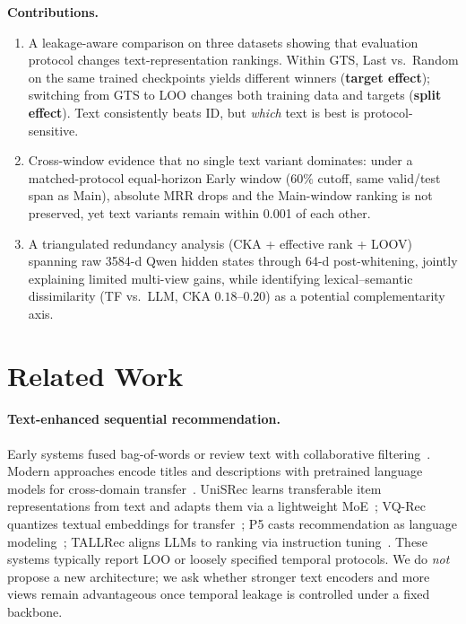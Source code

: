 \documentclass[sigconf,natbib=true,anonymous]{acmart}
\begin{document}
\smallskip\noindent\textbf{Contributions.}
\begin{enumerate}[leftmargin=*,itemsep=1pt]
\item A leakage-aware comparison on three datasets showing that evaluation protocol changes text-representation rankings.  Within GTS, Last vs.\ Random on the same trained checkpoints yields different winners (\textbf{target effect}); switching from GTS to LOO changes both training data and targets (\textbf{split effect}).  Text consistently beats ID, but \emph{which} text is best is protocol-sensitive.
\item Cross-window evidence that no single text variant dominates: under a matched-protocol equal-horizon Early window ($60\%$ cutoff, same valid/test span as Main), absolute MRR drops and the Main-window ranking is not preserved, yet text variants remain within 0.001 of each other.
\item A triangulated redundancy analysis (CKA + effective rank + LOOV) spanning raw 3584-d Qwen hidden states through 64-d post-whitening, jointly explaining limited multi-view gains, while identifying lexical--semantic dissimilarity (TF vs.\ LLM, CKA $0.18$--$0.20$) as a potential complementarity axis.
\end{enumerate}

\section{Related Work}
\label{sec:related}

\paragraph{Text-enhanced sequential recommendation.}
Early systems fused bag-of-words or review text with collaborative filtering~\cite{wang2015cdl,salton1988termweighting}.
Modern approaches encode titles and descriptions with pretrained language models for cross-domain transfer~\cite{hou2022unisrec,hou2023vqrec,geng2022p5,bao2023tallrec}.
UniSRec learns transferable item representations from text and adapts them via a lightweight MoE~\cite{hou2022unisrec}; VQ-Rec quantizes textual embeddings for transfer~\cite{hou2023vqrec}; P5 casts recommendation as language modeling~\cite{geng2022p5}; TALLRec aligns LLMs to ranking via instruction tuning~\cite{bao2023tallrec}.
These systems typically report LOO or loosely specified temporal protocols.
We do \emph{not} propose a new architecture; we ask whether stronger text encoders and more views remain advantageous once temporal leakage is controlled under a fixed backbone.
\end{document}
